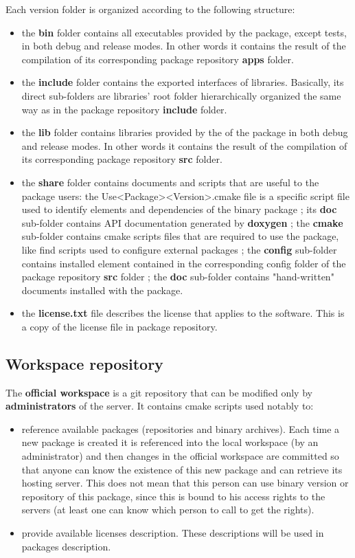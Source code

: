 \documentclass[12pt,a4paper]{article}
\begin{document}
Each version folder is organized according to the following structure:
\begin{itemize}
\item the \textbf{bin} folder contains all executables provided by the package, except tests, in both debug and release modes. In other words it contains the result of the compilation of its corresponding package repository \textbf{apps} folder.
\item the \textbf{include} folder contains the exported interfaces of libraries. Basically, its direct sub-folders are libraries' root folder hierarchically organized the same way as in the package repository \textbf{include} folder.
\item the \textbf{lib} folder contains libraries provided by the of the package in both debug and release modes.  In other words it contains the result of the compilation of its corresponding package repository \textbf{src} folder.
\item the \textbf{share} folder contains documents and scripts that are useful to the package users: the Use<Package><Version>.cmake file is a specific script file used to identify elements and dependencies of the binary package ; its \textbf{doc} sub-folder  contains API documentation generated by \textbf{doxygen} ; the \textbf{cmake} sub-folder contains cmake scripts files that are required to use the package, like find scripts used to configure external packages ; the \textbf{config} sub-folder contains installed element contained in the corresponding config folder of the package repository \textbf{src} folder ; the \textbf{doc} sub-folder contains "hand-written" documents installed with the package.
\item the \textbf{license.txt} file describes the license that applies to the software. This is a copy of the license file in package repository.
\end{itemize}

\subsection{Workspace repository}

The \textbf{official workspace} is a git repository that can be modified only by \textbf{administrators} of the server. It contains cmake scripts used notably to:
\begin{itemize}
\item reference available packages (repositories and binary archives). Each time a new package is created it is referenced into the local workspace (by an administrator) and then changes in the official workspace are committed so that anyone can know the existence of this new package and can retrieve its hosting server. This does not mean that this person can use binary version or repository of this package, since this is bound to his access rights to the servers (at least one can know which person to call to get the rights).
\item provide available licenses description. These descriptions will be used in packages description.
\end{itemize}
\end{document}
